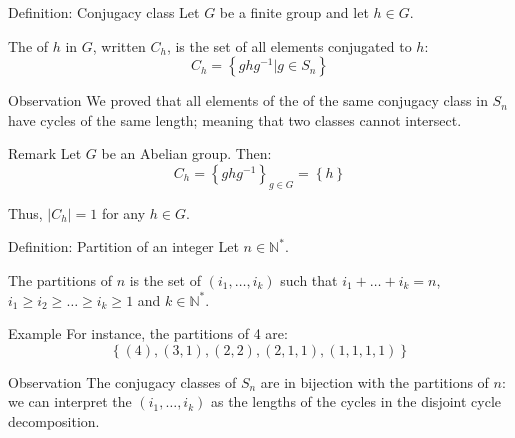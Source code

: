 \documentclass[a4paper]{article}
\begin{document}
\begin{parag}{Definition: Conjugacy class}
    Let $G$ be a finite group and let $h \in G$.

    The  of $h$ in $G$, written $C_h$, is the set of all elements conjugated to $h$: 
    \[C_h = \left\{ghg^{-1} | g \in S_n\right\}\]
    
    \begin{subparag}{Observation}
        We proved that all elements of the of the same conjugacy class in $S_n$ have cycles of the same length; meaning that two classes cannot intersect.
    \end{subparag}
    
    \begin{subparag}{Remark}
        Let $G$ be an Abelian group. Then: 
        \[C_h = \left\{g h g^{-1}\right\}_{g \in G} = \left\{h\right\}\]
        
        Thus, $\left|C_h\right| = 1$ for any $h \in G$.
    \end{subparag}
\end{parag}

\begin{parag}{Definition: Partition of an integer}
    Let $n \in \mathbb{N}^*$.

    The partitions of $n$ is the set of $\left(i_1, \ldots, i_k\right)$ such that $i_1 + \ldots + i_k = n$, $i_1 \geq i_2 \geq \ldots \geq i_k \geq 1$ and $k \in \mathbb{N}^*$.

    \begin{subparag}{Example}
        For instance, the partitions of 4 are: 
        \[\left\{\left(4\right), \left(3, 1\right), \left(2, 2\right), \left(2, 1, 1\right), \left(1, 1, 1, 1\right)\right\}\]
    \end{subparag}
\end{parag}

\begin{parag}{Observation}
    The conjugacy classes of $S_n$ are in bijection with the partitions of $n$: we can interpret the $\left(i_1, \ldots, i_k\right)$ as the lengths of the cycles in the disjoint cycle decomposition.
\end{parag}
\end{document}
